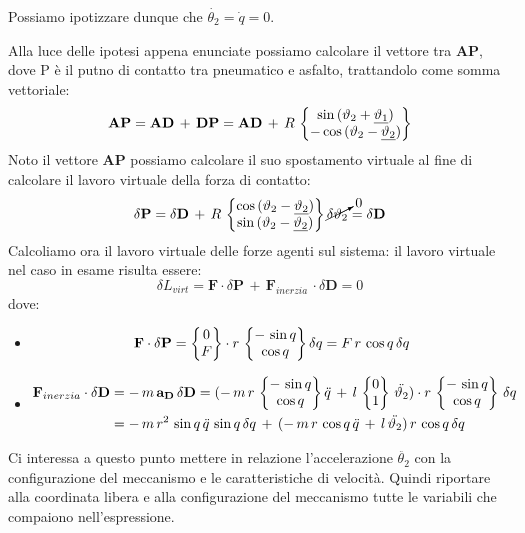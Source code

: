 Possiamo ipotizzare dunque che $\dot{\theta_2} = \dot{q} = 0$.

Alla luce delle ipotesi appena enunciate possiamo calcolare il vettore tra \textbf{AP}, dove P è il putno di contatto tra pneumatico e asfalto, trattandolo come somma vettoriale:
\[\mathbf{AP} = \mathbf{AD}\,+\,\mathbf{DP} = \mathbf{AD}\,+\,R\,\begin{Bmatrix}\sin{(\vartheta_2+\underline{\vartheta_1})}\\-\cos{(\vartheta_2-\underline{\vartheta_2})}\end{Bmatrix}\]
Noto il vettore \textbf{AP} possiamo calcolare il suo spostamento virtuale al fine di calcolare il lavoro virtuale della forza di contatto:
\[\delta \mathbf{P} = \delta \mathbf{D}\,+\,R\,\begin{Bmatrix}\cos{(\vartheta_2-\underline{\vartheta_2})}\\\sin{(\vartheta_2-\underline{\vartheta_2})}\end{Bmatrix}\cancelto{0}{\delta \vartheta_2} = \delta \mathbf{D}\]
Calcoliamo ora il lavoro virtuale delle forze agenti sul sistema: il lavoro virtuale nel caso in esame risulta essere:
\[\delta L_{virt} = \mathbf{F}\cdot\delta\mathbf{P} \,+\,\mathbf{F}_{inerzia}\,\cdot\delta\mathbf{D} = 0\]
dove:
\begin{itemize}
\item \[\mathbf{F}\cdot\delta \mathbf{P} = \begin{Bmatrix}0\\F\end{Bmatrix}\cdot r\,\begin{Bmatrix}-\,\sin{q}\\\cos{q}\end{Bmatrix}\delta q = F\,r\,\cos{q}\,\delta q\]
\item \begin{align*}
\mathbf{F}_{inerzia}\cdot\delta \mathbf{D} &= -\,m\,\mathbf{a_D}\,\delta \mathbf{D} = (-\,m\,r\,\begin{Bmatrix}-\,\sin{q}\\\cos{q}\end{Bmatrix}\ddot{q}\,+\,l\,\begin{Bmatrix}0\\1\end{Bmatrix}\,\ddot{\vartheta_2})\cdot r\,\begin{Bmatrix}-\,\sin{q}\\\cos{q}\end{Bmatrix}\,\delta q\\
&= -\,m\,r^2\,\sin{q}\,\ddot{q}\,\sin{q}\,\delta q\,+\,(-\,m\,r\,\cos{q}\,\ddot{q}\,+\,l\,\ddot{\vartheta_2})\,r\,\cos{q}\,\delta q
\end{align*}
\end{itemize}
Ci interessa a questo punto mettere in relazione l'accelerazione $\ddot{\theta_2}$ con la configurazione del meccanismo e le caratteristiche di velocità. Quindi riportare alla coordinata libera e alla configurazione del meccanismo tutte le variabili che compaiono nell'espressione.

